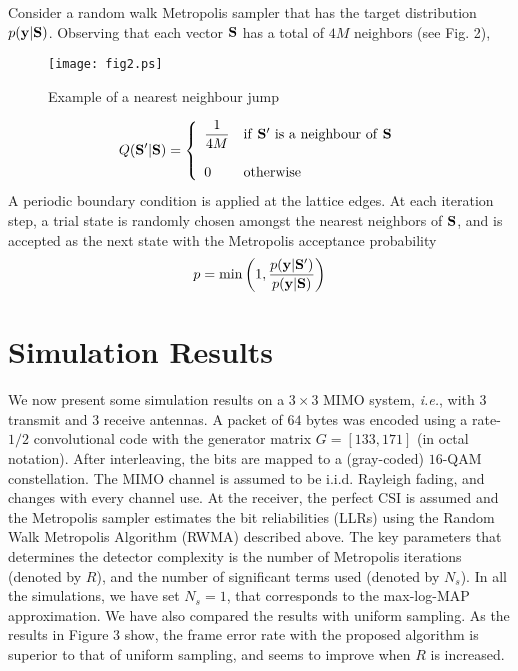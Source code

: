 \documentclass[pre,12pt,aps]{revtex4}
\begin{document}
Consider a random walk Metropolis sampler that has the 
target distribution 
$p({\bf y}\vert {\bf S})$. 
Observing 
that each vector ${\bf S}$  has a total of  $4M$ neighbors
(see Fig. 2),

\begin{figure}[hp]
\centering
\texttt{[image: fig2.ps]}
\caption{Example of a nearest neighbour jump}
\end{figure}
\begin{eqnarray}
Q({\bf S'}\vert{\bf S})=\left\{ \begin{array}{ll}
\displaystyle\frac{1}{4M} & {\rm if}\  {\bf S'}\  {\rm is \ a\ neighbour\  of\ }
                     {\bf S}\\
                                           &\\
               0 & {\rm otherwise}\\ \end{array}\right.
\end{eqnarray}
A periodic boundary condition is applied at the lattice edges. 
At each iteration step, a trial state is randomly chosen 
amongst  the nearest neighbors of ${\bf S}$, and is accepted as the next 
state with the Metropolis acceptance probability $$p={\rm min}\left( 1,\frac{p({\bf y}\vert {\bf S'})}{
p({\bf y}\vert {\bf S})}\right)$$

\section{Simulation Results}

We now present some simulation results on a 
$3\times 3$ MIMO system, {\it i.e.}, with $3$ transmit and 
$3$ receive antennas. A packet of $64$ bytes was 
encoded using a rate-$1/2$ convolutional code 
with the generator matrix $G = [133,171]$ (in octal notation).  
After interleaving, the bits are mapped to 
a (gray-coded) $16$-QAM constellation. The MIMO 
channel is assumed to be i.i.d. Rayleigh fading, 
and changes with every channel use. At the receiver, 
the perfect CSI is assumed and the Metropolis sampler 
estimates the bit reliabilities (LLRs) using the Random 
Walk Metropolis Algorithm (RWMA) described above. 
The key parameters that determines the detector 
complexity is the number of Metropolis iterations 
(denoted by $R$), and the number of significant 
terms used (denoted by $N_s$). 
In all the  simulations, we have set $N_s=1$, that corresponds 
to the max-log-MAP approximation. We have also compared 
the results with uniform sampling. As the results 
in Figure 3 show, the frame error rate with the 
proposed algorithm is superior to that of uniform 
sampling, and seems to improve when $R$  is increased.  
\end{document}

